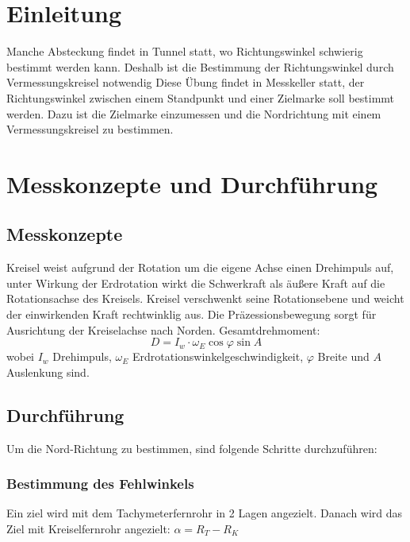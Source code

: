 \documentclass[12pt]{article}
\begin{document}
	\pagestyle{main}
\tableofcontents
\newpage
\section{Einleitung}
Manche Absteckung findet in Tunnel statt, wo Richtungswinkel schwierig bestimmt werden kann. Deshalb ist die Bestimmung der Richtungswinkel durch Vermessungskreisel notwendig \newline
\newline
Diese Übung findet in Messkeller statt, der Richtungswinkel zwischen einem Standpunkt und einer Zielmarke soll bestimmt werden. Dazu ist die Zielmarke einzumessen und die Nordrichtung mit einem Vermessungskreisel zu bestimmen. 
\section{Messkonzepte und Durchführung}
\subsection{Messkonzepte}
Kreisel weist aufgrund der Rotation um die eigene Achse einen Drehimpuls auf, unter Wirkung der Erdrotation wirkt die Schwerkraft als äußere Kraft auf die Rotationsachse des Kreisels. Kreisel verschwenkt seine Rotationsebene und weicht der einwirkenden Kraft rechtwinklig aus. Die Präzessionsbewegung sorgt für Ausrichtung der Kreiselachse nach Norden. \newline
Gesamtdrehmoment:
\begin{equation*}
D = I_w \cdot \omega_E \cos \varphi \sin A
\end{equation*}
wobei $I_w$ Drehimpuls, $\omega_E$ Erdrotationswinkelgeschwindigkeit, $\varphi$ Breite und $A$ Auslenkung sind.
\subsection{Durchführung}
Um die Nord-Richtung zu bestimmen, sind folgende Schritte durchzuführen: 
\subsubsection{Bestimmung des Fehlwinkels}
Ein ziel wird mit dem Tachymeterfernrohr in 2 Lagen angezielt. Danach wird das Ziel mit Kreiselfernrohr angezielt: $\alpha = R_T - R_K$
\end{document}
